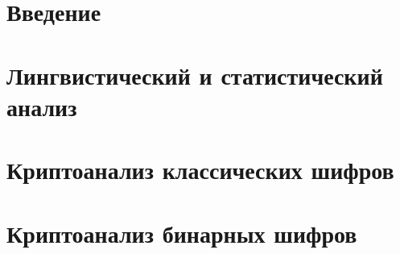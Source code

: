 \documentclass[unicode,12pt,a4paper,oneside,fleqn]{article}
\begin{document}
    
    \tableofcontents
    \pagebreak

    
    \section{Введение}
    
    \pagebreak
    
    \section{Лингвистический и статистический анализ}
    
    
    
    \pagebreak

    \section{Криптоанализ классических шифров}
    
    
    
    
    
    \pagebreak

    \section{Криптоанализ бинарных шифров}
    
    
    \pagebreak

    
    
\end{document}
